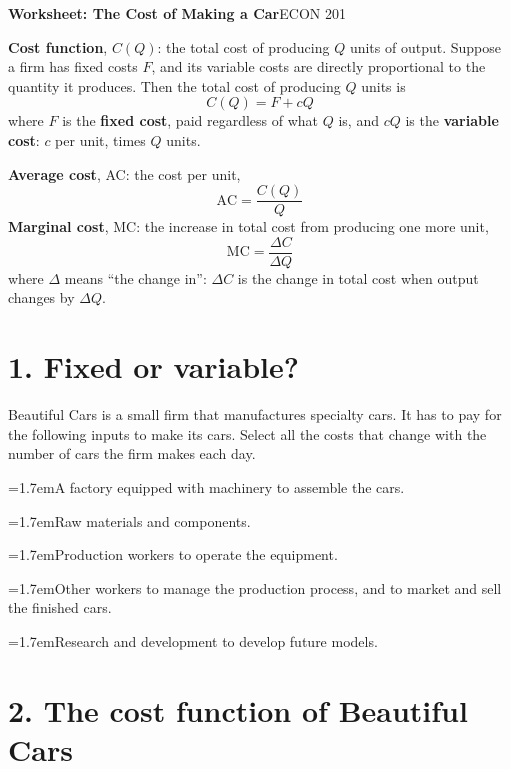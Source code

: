 \documentclass[11pt]{article}
\newcounter{q}
\begin{document}
{\LARGE\bfseries\color{accent} Worksheet: The Cost of Making a Car}\hfill{\large ECON 201}

\newcommand{\term}[1]{\textcolor{accentdark}{\textbf{#1}}}

\begin{tcolorbox}[colback=cream, colframe=accent, boxrule=0.6pt, arc=2pt,
  left=6pt, right=6pt, top=4pt, bottom=4pt, title=Definitions,
  fonttitle=\bfseries, coltitle=white]
\term{Cost function}, $C(Q)$: the total cost of producing $Q$ units of
output. Suppose a firm has fixed costs $F$, and its variable costs are
directly proportional to the quantity it produces. Then the total cost of
producing $Q$ units is
\[
  C(Q) = F + cQ
\]
where $F$ is the \term{fixed cost}, paid regardless of what $Q$ is, and
$cQ$ is the \term{variable cost}: $c$ per unit, times $Q$ units.

\term{Average cost}, AC: the cost per unit,
\[
  \text{AC} = \frac{C(Q)}{Q}
\]
\term{Marginal cost}, MC: the increase in total cost from producing one more
unit,
\[
  \text{MC} = \frac{\Delta C}{\Delta Q}
\]
where $\Delta$ means ``the change in'': $\Delta C$ is the change in total
cost when output changes by $\Delta Q$.
\end{tcolorbox}

\section{1. Fixed or variable?}\setcounter{q}{0}

Beautiful Cars is a small firm that manufactures specialty cars. It has to
pay for the following inputs to make its cars. Select all the costs that
change with the number of cars the firm makes each day.

\newcommand{\tick}[1]{\par\noindent\hangindent=1.7em\makebox[1.7em][l]{$\square$}#1\par}
\tick{A factory equipped with machinery to assemble the cars.}
\tick{Raw materials and components.}
\tick{Production workers to operate the equipment.}
\tick{Other workers to manage the production process, and to market and sell the finished cars.}
\tick{Research and development to develop future models.}
\vspace{4pt}

\section{2. The cost function of Beautiful Cars}\setcounter{q}{0}
\end{document}
